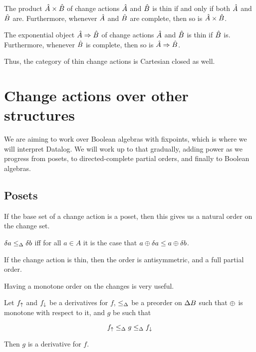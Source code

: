 \begin{prop}
  The product $\hat{A} \times \hat{B}$ of change actions $\hat{A}$ and $\hat{B}$ is thin if and only if both $\hat{A}$ and $\hat{B}$ are.
  Furthermore, whenever $\hat{A}$ and $\hat{B}$ are complete, then so is $\hat{A} \times \hat{B}$.

  The exponential object $\hat{A} \Rightarrow \hat{B}$ of change actions $\hat{A}$ and $\hat{B}$ is thin if $\hat{B}$ is.
  Furthermore, whenever $\hat{B}$ is complete, then so is $\hat{A} \Rightarrow \hat{B}$.
\end{prop}

Thus, the category of thin change actions is Cartesian closed as well.

\section{Change actions over other structures}
\label{sec:moreStructures}

We are aiming to work over Boolean algebras with fixpoints, which is where we
will interpret Datalog. We will work up to that gradually, adding power as we
progress from posets, to directed-complete partial orders, and
finally to Boolean algebras.

\subsection{Posets}

If the base set of a change action is a poset, then this gives us a natural
order on the change set.

\begin{defn}
  $\delta a \leq_\Delta \delta b$ iff for all $a \in A$ it is the case that $a \oplus \delta a \leq a \oplus \delta b$.
\end{defn}

If the change action is thin, then the order is antisymmetric, and a
full partial order.

Having a monotone order on the changes is very useful.

\begin{thm}
  \label{thm:sandwich}
  Let $f_\uparrow$ and $f_\downarrow$ be a derivatives for $f$, $\leq_\Delta$ be a preorder on $\Delta B$ such that $\oplus$ is monotone with
  respect to it, and $g$ be such that

  \begin{displaymath}
    f_\uparrow \leq_\Delta g \leq_\Delta f_\downarrow
  \end{displaymath}

  Then $g$ is a derivative for $f$.
\end{thm}

